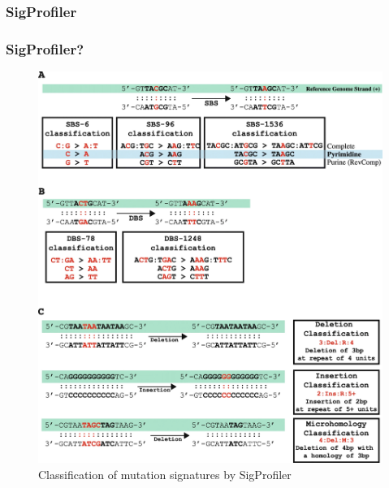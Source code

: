 \documentclass{beamer}
\begin{document}
    \subsubsection{SigProfiler}
    \begin{frame}
        \frametitle{SigProfiler?}

        \begin{figure}
            \includegraphics[width=0.4 \linewidth]{figures/Workflow/SigProfiler.jpg}
            \caption{Classification of mutation signatures by SigProfiler \protect\cite{SigProfiler1, SigProfiler2, SigProfiler3}}
        \end{figure}
    \end{frame}
\end{document}

